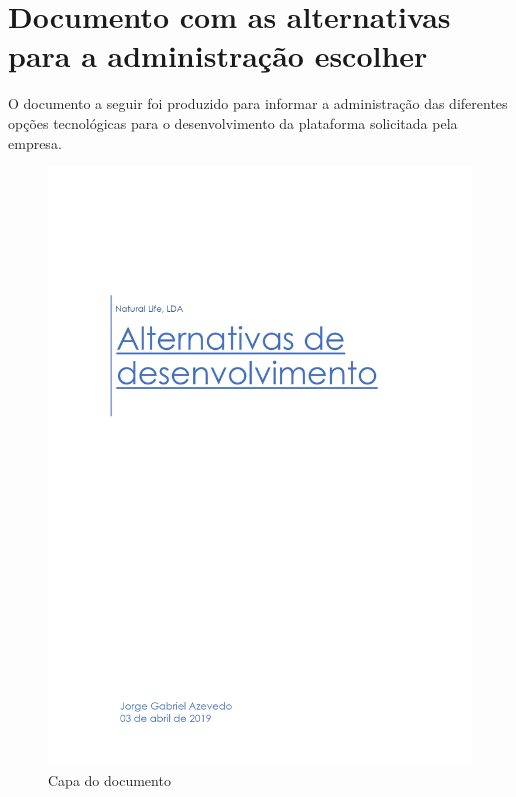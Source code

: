 \renewcommand{\appendixname}{Anexo}
\appendix
\chapter{Documento com as alternativas para a administração escolher }
\label{anexo:A}

O documento a seguir foi produzido para informar a administração das diferentes opções tecnológicas para o desenvolvimento da plataforma solicitada pela empresa.

\newpage

\begin{figure}[H]
	\centering
	\includegraphics[width=\linewidth, frame]{figuras/Alternativas/pag0.jpg}
	\caption{Capa do documento}
	\label{fig:anexo_a_capa}
\end{figure}
\newpage

